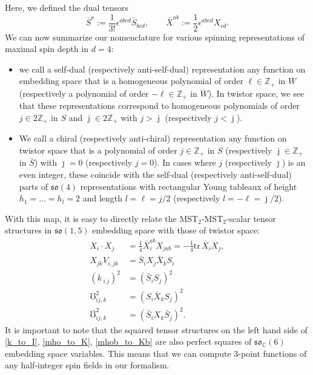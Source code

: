 \documentclass{article}
\def\mK{k}
\def \Zs {\mathbb{Z}}
\def \Cs {\mathbb{C}}
\begin{document}
Here, we defined the dual tensors
\begin{equation}
\bar{S}^a := \frac{1}{3!}\epsilon^{abcd} \bar{S}_{bcd}, \qquad \bar{X}^{ab} := \frac{1}{2} \epsilon^{abcd} X_{cd}. 
\end{equation}
We can now summarize our nomenclature for various spinning representations of maximal spin depth in $d=4$:
\begin{itemize}
    \item we call a self-dual (respectively anti-self-dual) representation any function on embedding space that is a homogeneous polynomial of order $\ell \in \Zs_+$ in $W$ (respectively a polynomial of order $-\ell \in \Zs_+$ in $\overline{W}$). In twistor space, we see that these representations correspond to homogeneous polynomials of order $j \in 2 \Zs_+$ in $S$ and $\bar{\jmath} \in 2 \Zs_+$ with $j>\bar{\jmath}$ (respectively $j<\bar{\jmath}$). 
    \item We call a chiral (respectively anti-chiral) representation any function on twistor space that is a polynomial of order $j \in \Zs_+$ in $S$ (respectively $\bar{\jmath} \in \Zs_+$ in $\bar{S}$) with $\bar{\jmath} = 0$ (respectively $j=0$). In cases where $j$ (respectively $\bar{\jmath}$) is an even integer, these coincide with the self-dual (respectively anti-self-dual) parts of $\mathfrak{so}(4)$ representations with rectangular Young tableaux of height $h_1=\dots=h_{l}=2$ and length $l=\ell = j/2$ (respectively $l=-\ell=\bar{\jmath}/2$). 
\end{itemize}

With this map, it is easy to directly relate the MST$_2$-MST$_2$-scalar tensor 
structures in $\mathfrak{so}(1,5)$ embedding space with those of twistor space:
\begin{align}
X_i \cdot X_j & = \frac{1}{4} \bar{X}_i^{ab} X_{jab} = - \frac{1}{4} \mathrm{tr}\, \bar{X}_i X_j, \\
 X_{jk} V_{i,jk} &= \bar{S}_i X_j \bar{X}_k S_i \\
 (\mK_{\bar{\imath}j})^2 &= (\bar{S}_i S_j)^2 \label{k_to_I} \\
 \mho_{ij,k}^2 &= (S_i \bar{X}_k S_j)^2 \label{mho_to_K} \\
\bar{\mho}_{ij,k}^2 &= (\bar{S}_i X_k \bar{S}_j)^2. \label{mhob_to_Kb}
\end{align}
It is important to note that the squared tensor
structures on the left hand side of \eqref{k_to_I}, \eqref{mho_to_K}, \eqref{mhob_to_Kb} are also perfect
squares of $\mathfrak{so}_{\Cs}(6)$ embedding space variables. This means that we can compute 3-point functions of any
half-integer spin fields in our formalism.
\end{document}
